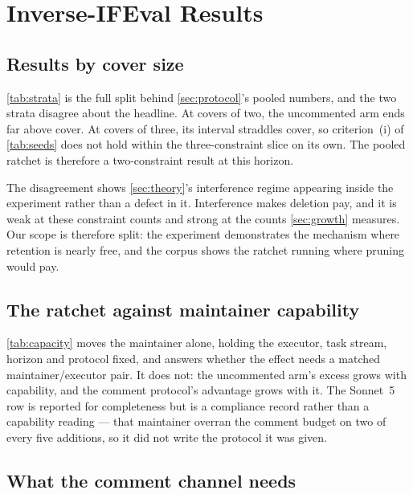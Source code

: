 
\section{Inverse-IFEval Results}
\label{sec:appendix:lab}

\subsection{Results by cover size}
\label{sec:appendix:strata}



\autoref{tab:strata} is the full split behind \autoref{sec:protocol}'s pooled numbers, and the two
strata disagree about the headline. At covers of two, the uncommented arm ends far above cover. At
covers of three, its interval straddles cover, so criterion~(i) of \autoref{tab:seeds} does not
hold within the three-constraint slice on its own. The pooled ratchet is therefore a two-constraint
result at this horizon.

The disagreement shows \autoref{sec:theory}'s interference regime appearing inside the experiment
rather than a defect in it. Interference makes deletion pay, and it is weak at these constraint
counts and strong at the counts \autoref{sec:growth} measures. Our scope is therefore split: the
experiment demonstrates the mechanism where retention is nearly free, and the corpus shows the
ratchet running where pruning would pay.

\subsection{The ratchet against maintainer capability}
\label{sec:appendix:capacity}



\autoref{tab:capacity} moves the maintainer alone, holding the executor, task stream, horizon and
protocol fixed, and answers whether the effect needs a matched maintainer/executor pair. It does not:
the uncommented arm's excess grows with capability, and the comment protocol's advantage grows with it.
The Sonnet~5 row is reported for completeness but is a compliance record rather than a capability
reading --- that maintainer overran the comment budget on two of every five additions, so it did not
write the protocol it was given.

\subsection{What the comment channel needs}
\label{sec:appendix:ablations}

